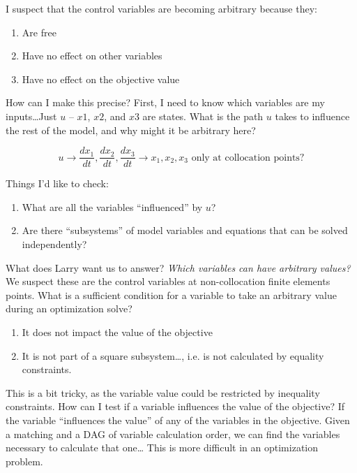 \documentclass{article}
\begin{document}
I suspect that the control variables are becoming arbitrary because they:
\begin{enumerate}
  \item Are free
  \item Have no effect on other variables
  \item Have no effect on the objective value
\end{enumerate}
How can I make this precise? First, I need to know which variables are my
inputs\ldots Just $u$ -- $x1$, $x2$, and $x3$ are states.
What is the path $u$ takes to influence the rest of the model, and why might
it be arbitrary here?

\[
u \rightarrow \frac{dx_1}{dt}, \frac{dx_2}{dt}, \frac{dx_3}{dt}
\rightarrow x_1, x_2, x_3 \text{ only at collocation points?}
\]

Things I'd like to check:
\begin{enumerate}
  \item What are all the variables ``influenced'' by $u$?
  \item Are there ``subsystems'' of model variables and equations that can
    be solved independently?
\end{enumerate}
What does Larry want us to answer?
\emph{Which variables can have arbitrary values?}
We suspect these are the control variables at non-collocation finite elements
points.
What is a sufficient condition for a variable to take an arbitrary value
during an optimization solve?
\begin{enumerate}
  \item It does not impact the value of the objective
  \item It is not part of a square subsystem\ldots, i.e. is not calculated
    by equality constraints.
\end{enumerate}
This is a bit tricky, as the variable value could be restricted by inequality
constraints.
How can I test if a variable influences the value of the objective?
If the variable ``influences the value'' of any of the variables in the
objective.
Given a matching and a DAG of variable calculation order, we can find the
variables necessary to calculate that one\ldots
This is more difficult in an optimization problem.
\end{document}
